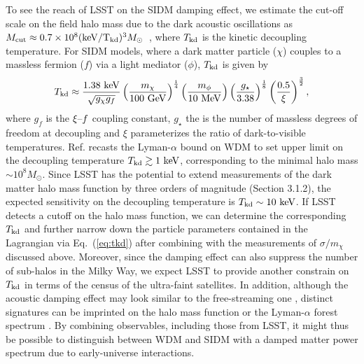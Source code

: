 To see the reach of LSST on the SIDM damping effect, we estimate the cut-off scale on the field halo mass due to the dark acoustic oscillations as $M_{\rm cut}\approx0.7\times10^{8}({\rm keV/T_{\rm kd}})^3M_\odot$~\citep{1512.05349}, where $T_{\rm kd}$ is the kinetic decoupling temperature. For SIDM models, where a dark matter particle ($\chi$) couples to a massless fermion ($f$) via a light mediator ($\phi$), $T_{\rm kd}$ is given by~\citep{Aarssen:2012fx,1512.05344}
\begin{equation}
T_{\rm kd}\approx\frac{1.38~{\rm keV}}{\sqrt{g_\chi g_f}}\left(\frac{m_\chi}{100~{\rm GeV}}\right)^{\frac{1}{4}}\left(\frac{m_\phi}{10~{\rm MeV}}\right)\left(\frac{g_\star}{3.38}\right)^{\frac{1}{8}}\left(\frac{0.5}{\xi}\right)^{\frac{3}{2}},
\label{eq:tkd}
\end{equation}
where $g_f$ is the $\xi\textup{--}f$ coupling constant, $g_\star$ the is the number of massless degrees of freedom at decoupling and $\xi$ parameterizes the ratio of dark-to-visible temperatures. Ref. \cite{Huo:2017vef} recasts the Lyman-$\alpha$ bound on WDM to set upper limit on the decoupling temperature $T_{\rm kd}\gtrsim 1~{\rm keV}$, corresponding to the minimal halo mass $\sim10^8 M_\odot$. Since LSST has the potential to extend measurements of the dark matter halo mass function by three orders of magnitude (Section 3.1.2), the expected sensitivity on the decoupling temperature is $T_{\rm kd}\sim 10~{\rm keV}$. If LSST detects a cutoff on the halo mass function, we can determine the corresponding $T_{\rm kd}$ and further narrow down the particle parameters contained in the Lagrangian via Eq.~(\ref{eq:tkd}) after combining with the measurements of $\sigma/m_\chi$ discussed above. Moreover, since the damping effect can also suppress the number of sub-halos in the Milky Way, we expect LSST to provide another constrain on $T_{\rm kd}$ in terms of the census of the ultra-faint satellites. In addition, although the acoustic damping effect may look similar to the free-streaming one \citep[\eg][]{1512.05349}, distinct signatures can be imprinted on the halo mass function \citep{Buckley:2014ab,Sameie:2018juk} or the Lyman-$\alpha$ forest spectrum \citep{Krall:2017xcw,Bose:2018juc}. By combining observables, including those from LSST, it might thus be possible to distinguish between WDM and SIDM with a damped matter power spectrum due to early-universe interactions.







